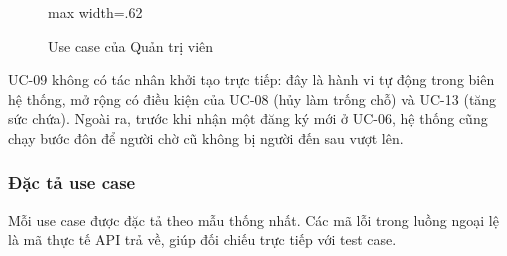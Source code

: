 \begin{figure}[H]
\centering
\begin{adjustbox}{max width=.62\linewidth}
\end{adjustbox}
\vspace{8pt}
\caption{Use case của Quản trị viên}\label{fig:t3-uc-admin}
\end{figure}

UC-09 không có tác nhân khởi tạo trực tiếp: đây là hành vi tự động trong biên hệ thống, mở rộng có điều kiện của UC-08 (hủy làm trống chỗ) và UC-13 (tăng sức chứa). Ngoài ra, trước khi nhận một đăng ký mới ở UC-06, hệ thống cũng chạy bước đôn để người chờ cũ không bị người đến sau vượt lên.

\subsubsection{Đặc tả use case}

Mỗi use case được đặc tả theo mẫu thống nhất. Các mã lỗi trong luồng ngoại lệ là mã thực tế API trả về, giúp đối chiếu trực tiếp với test case.

\newenvironment{ucspec}[2]{%
  \begingroup\small\renewcommand{\arraystretch}{1.12}%
  \begin{longtable}{@{}>{\bfseries\raggedright\arraybackslash}p{.19\linewidth}>{\raggedright\arraybackslash}p{.77\linewidth}@{}}
  \caption{Đặc tả #1 -- #2}\\
  \toprule
  Use Case ID & #1\\
  Use Case Name & #2\\\midrule
  \endfirsthead
  \toprule\endhead
  \bottomrule\endfoot
}{%
  \end{longtable}\endgroup
}

